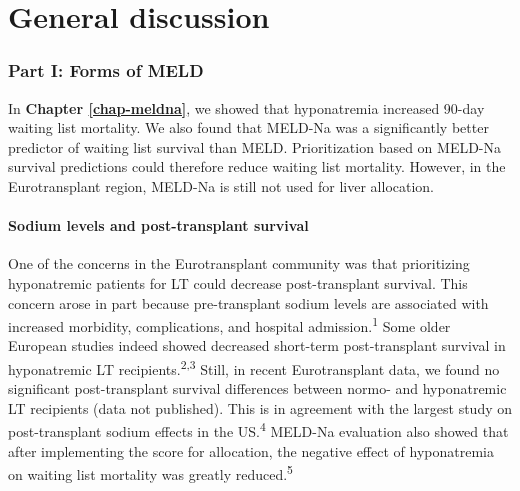 \documentclass[11pt,english,]{book} %
\begin{document}
\newpage
\pagecolor{black}
\color{white}
\thispagestyle{plain}

\mbox{}

\hypertarget{gendisc}{%
\chapter{General discussion}\label{gendisc}}

\newpage
\nopagecolor
\color{black}

\hypertarget{part-i-forms-of-meld-1}{%
\subsection*{Part I: Forms of MELD}\label{part-i-forms-of-meld-1}}

In \textbf{Chapter \ref{chap-meldna}}, we showed that hyponatremia increased 90-day waiting list mortality. We also found that MELD-Na was a significantly better predictor of waiting list survival than MELD. Prioritization based on MELD-Na survival predictions could therefore reduce waiting list mortality. However, in the Eurotransplant region, MELD-Na is still not used for liver allocation.

\hypertarget{sodium-levels-and-post-transplant-survival}{%
\subsubsection*{Sodium levels and post-transplant survival}\label{sodium-levels-and-post-transplant-survival}}

One of the concerns in the Eurotransplant community was that prioritizing hyponatremic patients for LT could decrease post-transplant survival. This concern arose in part because pre-transplant sodium levels are associated with increased morbidity, complications, and hospital admission.\textsuperscript{1} Some older European studies indeed showed decreased short-term post-transplant survival in hyponatremic LT recipients.\textsuperscript{2,3} Still, in recent Eurotransplant data, we found no significant post-transplant survival differences between normo- and hyponatremic LT recipients (data not published). This is in agreement with the largest study on post-transplant sodium effects in the US.\textsuperscript{4} MELD-Na evaluation also showed that after implementing the score for allocation, the negative effect of hyponatremia on waiting list mortality was greatly reduced.\textsuperscript{5}
\end{document}

